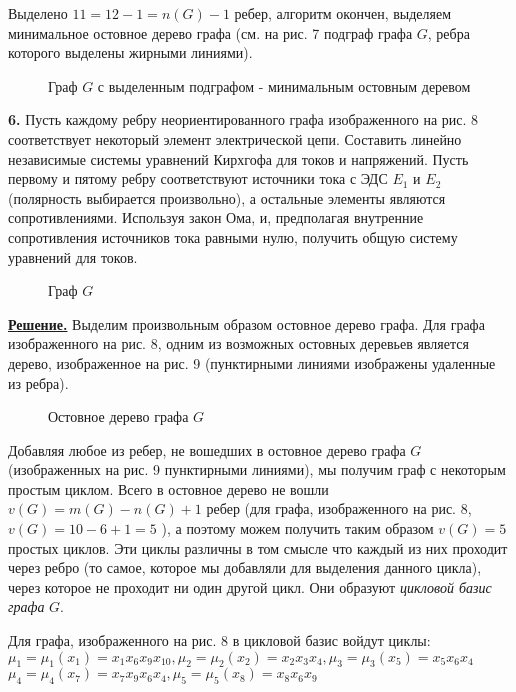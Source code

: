 \documentclass[12pt, letterpaper, titlepage]{article}
\begin{document}
Выделено $11 = 12-1 = n(G)-1$ ребер, алгоритм окончен, выделяем минимальное остовное дерево графа (см. на рис. 7 подграф графа $G$, ребра которого выделены жирными линиями).
\begin{figure}[H]\centering\caption{Граф $G$ с выделенным подграфом - минимальным остовным деревом}\end{figure}
\textbf{6.} Пусть каждому ребру неориентированного графа
изображенного на рис. 8 соответствует некоторый элемент электрической цепи.
Составить линейно независимые системы уравнений Кирхгофа для токов и напряжений.
Пусть первому и пятому ребру соответствуют источники тока с ЭДС $E_1$ и $E_2$ (полярность
выбирается произвольно), а остальные элементы являются сопротивлениями. Используя
закон Ома, и, предполагая внутренние сопротивления источников тока равными нулю,
получить общую систему уравнений для токов.
\begin{figure}[H]\centering\caption{Граф $G$}\end{figure}
\underline{\textbf{Решение.}}
Выделим произвольным образом остовное дерево графа. Для графа изображенного на рис. 8, одним из возможных
остовных деревьев является дерево, изображенное на рис. 9 (пунктирными линиями
изображены удаленные из ребра).
\begin{figure}[H]\centering\caption{Остовное дерево графа $G$}\end{figure}
Добавляя любое из ребер, не вошедших в остовное дерево графа $G$ (изображенных
на рис. 9 пунктирными линиями), мы получим граф с некоторым простым циклом. Всего в остовное дерево не вошли
$v(G)=m(G)-n(G)+1$ ребер (для графа, изображенного на рис. 8, $v(G)=10-6+1=5$ ), а поэтому можем
получить таким образом $v(G)=5$ простых циклов. Эти циклы различны в том смысле что
каждый из них проходит через ребро (то самое, которое мы добавляли для выделения
данного цикла), через которое не проходит ни один другой цикл. Они образуют \emph{цикловой
базис графа} $G$.

Для графа, изображенного на рис. 8 в цикловой базис войдут циклы:\\
$\mu_1 = \mu_1(x_1)=x_1x_6x_9x_{10}, \mu_2 = \mu_2(x_2)=x_2x_3x_4,\mu_3=\mu_3(x_5)=x_5x_6x_4$\\
$\mu_4 = \mu_4(x_7)=x_7x_9x_6x_4, \mu_5=\mu_5(x_8)=x_8x_6x_9$
\end{document}
